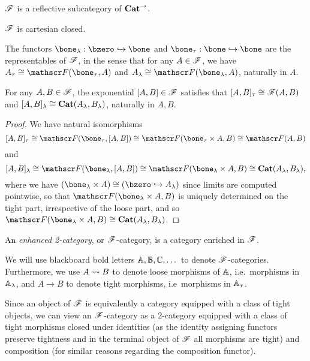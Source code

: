 \documentclass[../thesis.tex]{subfiles}
\begin{document}
  \begin{corollary}
    ${\mathscr{F}}$ is a reflective subcategory of ${\mathbf{Cat}}^\to$.
  \end{corollary}

  \begin{corollary}
    ${\mathscr{F}}$ is cartesian closed.
  \end{corollary}

  \begin{lemma}
    The functors $\bone_\lambda : \bzero \into \bone$ and $\bone_\tau : \bone \into \bone$ are the
    representables of ${\mathscr{F}}$, in the sense that for any $A \in {\mathscr{F}}$, we have $A_\tau \cong \sF(\bone_%
    \tau, A)$ and $A_\lambda
    \cong \sF(\bone_\lambda, A)$, naturally in $A$.
  \end{lemma}

  \begin{corollary}
    For any $A, B \in {\mathscr{F}}$, the exponential $[A,B] \in {\mathscr{F}}$ satisfies that $[A,B]_\tau \cong {\mathscr{F}}(A,B)
    $ and $[A,B]_\lambda \cong {\mathbf{Cat}}(A_\lambda, B_\lambda)$, naturally in $A,B$.
  \end{corollary}
  \begin{proof}
    We have natural isomorphisms
    \[[A,B]_\tau \cong \sF(\bone_\tau, [A,B]) \cong \sF(\bone_\tau \times A, B) \cong \sF(A,B)\]
    and
    \[[A,B]_\lambda \cong \sF(\bone_\lambda, [A,B]) \cong \sF(\bone_\lambda \times A, B) \cong
    \Cat(A_\lambda, B_\lambda),\]
    where we have $(\bone_\lambda \times A) \cong (\bzero \into A_\lambda)$ since limits are computed
    pointwise, so that $\sF(\bone_\lambda \times A, B)$ is uniquely determined on the tight part,
    irrespective of the loose part, and so $\sF(\bone_\lambda \times A, B) \cong \Cat(A_\lambda, B_%
    \lambda)$.
  \end{proof}
  
  \begin{definition}\label{def:F-category}
    An \emph{enhanced 2-category}, or ${\mathscr{F}}$-category, is a category enriched in ${\mathscr{F}}$.
  \end{definition}
  \begin{notation}
    We will use blackboard bold letters ${\mathbb{A}},{\mathbb{B}},{\mathbb{C}},\dots$ to denote ${\mathscr{F}}$-categories. Furthermore,
    we use $A \rightsquigarrow B$ to denote loose morphisms of ${\mathbb{A}}$, i.e.\ morphisms in ${\mathbb{A}}_\lambda$, and
    $A \to B$ to denote tight morphisms, i.e\ morphisms in ${\mathbb{A}}_\tau$.
  \end{notation}
  \begin{remark}
    Since an object of ${\mathscr{F}}$ is equivalently a category equipped with a class of tight objects, we
    can  view an ${\mathscr{F}}$-category as a 2-category equipped with a class of tight morphisms closed under
    identities (as the identity assigning functors preserve tightness and in the terminal object of
    ${\mathscr{F}}$ all morphisms are tight) and composition (for similar reasons regarding the composition functor).
  \end{remark}
\end{document}
